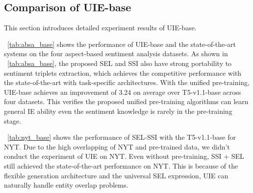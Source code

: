 \documentclass[11pt]{article}
\begin{document}
\subsection{Comparison of UIE-base}

This section introduces detailed experiment results of UIE-base.

\tablename~\ref{tab:absa_base} shows the performance of UIE-base and the state-of-the-art systems on the four aspect-based sentiment analysis datasets.
As shown in \tablename~\ref{tab:absa_base}, the proposed SEL and SSI also have strong portability to sentiment triplets extraction, which achieves the competitive performance with the state-of-the-art with task-specific architectures.
With the unified pre-training, UIE-base achieves an improvement of 3.24 on average over T5-v1.1-base across four datasets.
This verifies the proposed unified pre-training algorithms can learn general IE ability even the sentiment knowledge is rarely in the pre-training stage.

\tablename~\ref{tab:nyt_base} shows the performance of SEL-SSI with the T5-v1.1-base for NYT.
Due to the high overlapping of NYT and pre-trained data, we didn't conduct the experiment of UIE on NYT.
Even without pre-training, SSI + SEL still achieved the state-of-the-art performance on NYT.
This is because of the flexible generation architecture and the universal SEL expression, UIE can naturally handle entity overlap problems.
\end{document}
